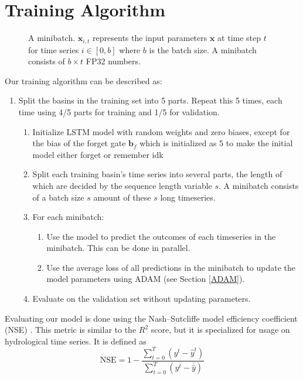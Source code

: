 \section{Training Algorithm}
\begin{figure}
\centering

\caption{A minibatch. $\bm{x}_{i,t}$ represents the input parameters $\bm{x}$ at time step $t$ for time series $i \in [0, b]$ where $b$ is the batch size. A minibatch consists of $b \times t$ FP32 numbers.}
\label{minibatch}
\end{figure}
Our training algorithm can be described as:
\begin{enumerate}
    \item Split the basins in the training set into 5 parts. Repeat this 5 times, each time using 4/5 parts for training and 1/5 for validation.\begin{enumerate}
        \item Initialize LSTM model with random weights and zero biases, except for the bias of the forget gate $\bm{b}_f$ which is initialized as 5 to make the initial model either forget or remember idk \citationneeded
        \item Split each training basin's time series into several parts, the length 
            of which are decided by the sequence length variable $s$. A minibatch 
            consists of a batch size $s$ amount of these $s$ long timeseries.
        \item For each minibatch:
        \begin{enumerate}
            \item Use the model to predict the outcomes of each timeseries in the 
                minibatch. This can be done in parallel.
            \item Use the average loss of all predictions in the minibatch to update 
                the model parameters using ADAM (see Section \ref{ADAM}).
        \end{enumerate}
        \item Evaluate on the validation set without updating parameters.
    \end{enumerate}
\end{enumerate}
Evaluating our model is done using the Nash–Sutcliffe model efficiency coefficient (NSE) \citep{NSE}.
This metric is similar to the $R^2$ score, but it is specialized for usage 
on hydrological time series.
It is defined as 
\begin{equation}
    \text{NSE} = 1 - \frac{\sum_{t=0}^T\left( y^t - \hat{y}^t\right)}{\sum_{t=0}^T\left(y^t - \bar{\hat{y}}\right)} \label{NSE}
\end{equation}
